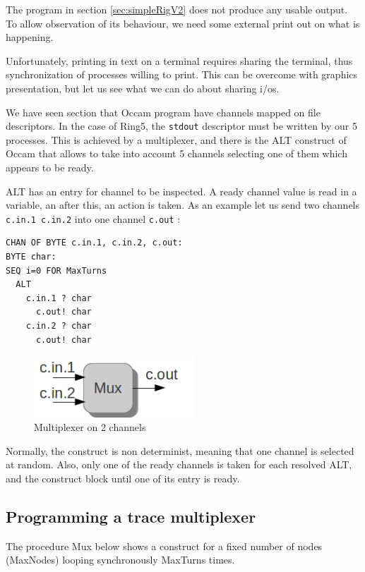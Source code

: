 \documentclass[times]{book}
\begin{document}
The program in section \ref{sec:simpleRigV2} does not produce any
usable output. To allow observation of its behaviour, we need 
some external print out on what is happening.

Unfortunately, printing in text on a terminal requires sharing the terminal,
thus synchronization of processes willing to print. This can be overcome 
with graphics presentation, but let us see what we can do about sharing i/os.

We have seen section  that Occam program have channels mapped on
file descriptors. In the case of Ring5, the {\tt stdout} descriptor must be
written by our 5 processes. This is achieved by a multiplexer, and there
is the ALT construct of Occam that allows to take into account 5 channels
selecting one of them which appears to be ready.

ALT has an entry for channel to be inspected. A ready channel value
is read in a variable, an after this, an action is taken.
As an example let us send two channels {\tt c.in.1 c.in.2} into one channel
 {\tt c.out} :


\begin{lstlisting} 
CHAN OF BYTE c.in.1, c.in.2, c.out:
BYTE char:
SEQ i=0 FOR MaxTurns
  ALT
    c.in.1 ? char
      c.out! char
    c.in.2 ? char
      c.out! char
\end{lstlisting} 


\begin{figure}[hbtp]
\begin{center} 
\includegraphics[width=6cm]{mux2.png}
\caption{Multiplexer on 2 channels
}
\label{fig:mux2}
\end{center}
\end{figure}

Normally, the construct is non determinist, meaning that one channel
is selected at random. Also, only one of the ready channels is taken
for each resolved ALT, and the construct block until one of its entry is ready.


\subsection {Programming a trace multiplexer }
\label{sec:ring5mux}
The procedure Mux below shows a construct for 
a fixed number of nodes (MaxNodes) looping
synchronously MaxTurns times.
\end{document}

